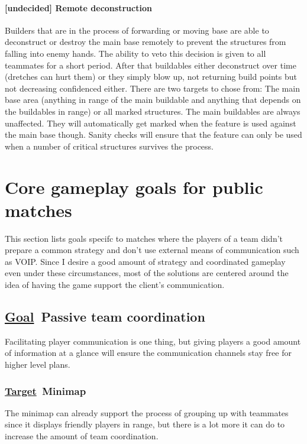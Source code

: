 \documentclass{scrartcl}
\newcommand{\goal}     [0]{\textbf{\underline{Goal}\ }}
\newcommand{\target}   [0]{\textbf{\underline{Target}\ }}
\newcommand{\undecided}[0]{\textcolor{undecided}{\textbf{[undecided] }}}
\begin{document}
\paragraph{\undecided Remote deconstruction}

Builders that are in the process of forwarding or moving base are able to deconstruct or destroy the main base remotely to prevent the structures from falling into enemy hands. The ability to veto this decision is given to all teammates for a short period. After that buildables either deconstruct over time (dretches can hurt them) or they simply blow up, not returning build points but not decreasing confidenced either. There are two targets to chose from: The main base area (anything in range of the main buildable and anything that depends on the buildables in range) or all marked structures. The main buildables are always unaffected. They will automatically get marked when the feature is used against the main base though. Sanity checks will ensure that the feature can only be used when a number of critical structures survives the process.

\section{Core gameplay goals for public matches}

This section lists goals specifc to matches where the players of a team didn't prepare a common strategy and don't use external means of communication such as VOIP. Since I desire a good amount of strategy and coordinated gameplay even under these circumstances, most of the solutions are centered around the idea of having the game support the client's communication.

\subsection{\goal Passive team coordination}

Facilitating player communication is one thing, but giving players a good amount of information at a glance will ensure the communication channels stay free for higher level plans.

\subsubsection{\target Minimap}

The minimap can already support the process of grouping up with teammates since it displays friendly players in range, but there is a lot more it can do to increase the amount of team coordination.
\end{document}
